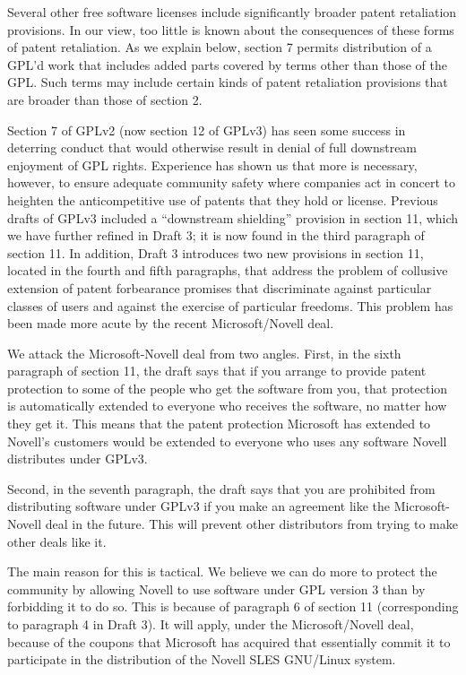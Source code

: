 Several other free software licenses include significantly broader patent
retaliation provisions. In our view, too little is known about the
consequences of these forms of patent retaliation. As we explain below,
section 7 permits distribution of a GPL'd work that includes added parts
covered by terms other than those of the GPL. Such terms may include certain
kinds of patent retaliation provisions that are broader than those of section
2.


Section 7 of GPLv2 (now section 12 of GPLv3) has seen some success in
deterring conduct that would otherwise result in denial of full downstream
enjoyment of GPL rights.  Experience has shown us that more is necessary,
however, to ensure adequate community safety where companies act in concert
to heighten the anticompetitive use of patents that they hold or license.
Previous drafts of GPLv3 included a ``downstream shielding'' provision in
section 11, which we have further refined in Draft 3; it is now found in the
third paragraph of section 11.  In addition, Draft 3 introduces two new
provisions in section 11, located in the fourth and fifth paragraphs, that
address the problem of collusive extension of patent forbearance promises
that discriminate against particular classes of users and against the
exercise of particular freedoms. This problem has been made more acute by the
recent Microsoft/Novell deal.

We attack the Microsoft-Novell deal from two angles. First, in the sixth
paragraph of section 11, the draft says that if you arrange to provide patent
protection to some of the people who get the software from you, that
protection is automatically extended to everyone who receives the software,
no matter how they get it. This means that the patent protection Microsoft
has extended to Novell's customers would be extended to everyone who uses any
software Novell distributes under GPLv3.

Second, in the seventh paragraph, the draft says that you are prohibited from
distributing software under GPLv3 if you make an agreement like the
Microsoft-Novell deal in the future. This will prevent other distributors
from trying to make other deals like it.

The main reason for this is tactical.  We believe we can do more to
protect the community by allowing Novell to use software under GPL
version 3 than by forbidding it to do so.  This is because of
paragraph 6 of section 11 (corresponding to paragraph 4 in Draft 3).
It will apply, under the Microsoft/Novell deal, because of the coupons
that Microsoft has acquired that essentially commit it to participate
in the distribution of the Novell SLES GNU/Linux system.

